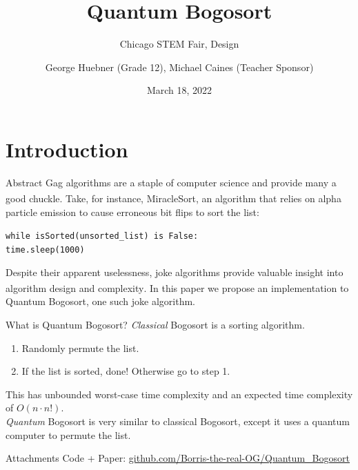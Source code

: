 \documentclass{beamer}
\title{Quantum Bogosort}
\subtitle{Chicago STEM Fair, Design}
\date{March 18, 2022}
\author{George Huebner (Grade 12), Michael Caines (Teacher Sponsor)}
\institute{Walter Payton College Prep}
\begin{document}
  \maketitle
  
  \section{Introduction}
  
  \begin{frame}{Abstract}
    Gag algorithms are a staple of computer science and provide many a good chuckle. Take, for instance, MiracleSort\textsuperscript{\color{blue}\cite{thompson_2013}}, an algorithm that relies on alpha particle emission to cause erroneous bit flips to sort the list:
    \begin{center} \texttt{while isSorted(unsorted\_list) is False: \\ \hspace{-70} time.sleep(1000)} \end{center}
    Despite their apparent uselessness, joke algorithms provide valuable insight into algorithm design and complexity\textsuperscript{\color{blue}\cite{gruber_holzer_ruepp_2007}}. In this paper we propose an implementation to Quantum Bogosort, one such joke algorithm.
  \end{frame}
  
  \begin{frame}{What is Quantum Bogosort?}
    \textit{Classical} Bogosort is a sorting algorithm.
    \begin{enumerate}
        \item Randomly permute the list.
        \item If the list is sorted, done! Otherwise go to step 1.
    \end{enumerate}
    This has unbounded worst-case time complexity and an expected time complexity of $O(n \cdot n!)$. \\
    \vspace{10}
    \textit{Quantum} Bogosort is very similar to classical Bogosort, except it uses a quantum computer to permute the list.
  \end{frame}
  
  \begin{frame}{Attachments}
  Code + Paper: \href{https://github.com/Borris-the-real-OG/Quantum_Bogosort}{\color{blue} \underline{github.com/Borris-the-real-OG/Quantum\_Bogosort}}
  \end{frame}
  
\end{document}
